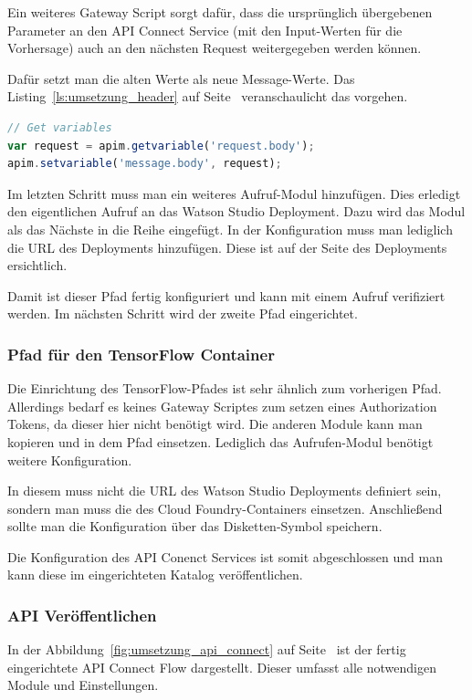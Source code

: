 Ein weiteres Gateway Script sorgt dafür, dass die ursprünglich übergebenen Parameter an den API Connect Service (mit den
Input-Werten für die Vorhersage) auch an den nächsten Request weitergegeben werden können.

Dafür setzt man die alten Werte als neue Message-Werte. Das Listing~\ref{ls:umsetzung_header} auf
Seite~\pageref{ls:umsetzung_header} veranschaulicht das vorgehen.

\begin{lstlisting}[language=JavaScript, caption=Gateway Script zum Setzen des Message-Bodys, label=ls:umsetzung_header]
// Get variables
var request = apim.getvariable('request.body');
apim.setvariable('message.body', request);
\end{lstlisting}

Im letzten Schritt muss man ein weiteres Aufruf-Modul hinzufügen. Dies erledigt den eigentlichen Aufruf an das Watson
Studio Deployment. Dazu wird das Modul als das Nächste in die Reihe eingefügt. In der Konfiguration muss man lediglich
die URL des Deployments hinzufügen. Diese ist auf der Seite des Deployments ersichtlich.

Damit ist dieser Pfad fertig konfiguriert und kann mit einem Aufruf verifiziert werden. Im nächsten Schritt wird der
zweite Pfad eingerichtet.

\subsubsection*{Pfad für den TensorFlow Container}
Die Einrichtung des TensorFlow-Pfades ist sehr ähnlich zum vorherigen Pfad. Allerdings bedarf es keines Gateway Scriptes
zum setzen eines Authorization Tokens, da dieser hier nicht benötigt wird. Die anderen Module kann man kopieren und in
dem Pfad einsetzen. Lediglich das Aufrufen-Modul benötigt weitere Konfiguration.

In diesem muss nicht die URL des Watson Studio Deployments definiert sein, sondern man muss die des Cloud
Foundry-Containers einsetzen. Anschließend sollte man die Konfiguration über das Disketten-Symbol speichern.

Die Konfiguration des API Conenct Services ist somit abgeschlossen und man kann diese im eingerichteten Katalog
veröffentlichen.

\subsubsection{API Veröffentlichen}
In der Abbildung~\ref{fig:umsetzung_api_connect} auf Seite~\pageref{fig:umsetzung_api_connect} ist der fertig eingerichtete
API Connect Flow dargestellt. Dieser umfasst alle notwendigen Module und Einstellungen.

